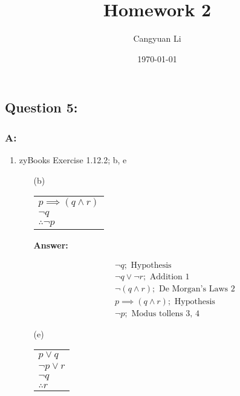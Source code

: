 \documentclass[14pt]{extreport}
\title{Homework 2}
\author{Cangyuan Li}
\date{\today}
\newcommand{\answer}[0]{\medskip \textbf{Answer:} \medskip}
\begin{document}
\maketitle

\subsection*{Question 5:}

\subsubsection*{A:}

\begin{enumerate}
    
    \item zyBooks Exercise 1.12.2; b, e
    
        \begin{enumerate}
            
            \item[(b)]
            \begin{tabular}{l}
                \( p \implies (q \land r) \) \\
                \( \neg q \) \\
                \hline
                \( \therefore \neg p \)
            \end{tabular}
            
                \answer

                \begin{align}
                    & \neg q; \text{ Hypothesis} \\
                    & \neg q \lor \neg r; \text{ Addition 1} \\
                    & \neg (q \land r); \text{ De Morgan's Laws 2} \\
                    & p \implies (q \land r); \text{ Hypothesis} \\
                    & \neg p; \text{ Modus tollens 3, 4}
                \end{align}

            \item[(e)]
            \begin{tabular}{l}
                \( p \lor q \) \\
                \( \neg p \lor r \) \\
                \( \neg q \) \\
                \hline
                \( \therefore r \)
            \end{tabular}


\end{enumerate}
\end{enumerate}
\end{document}
